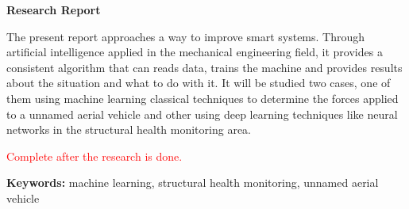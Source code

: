 \begin{center}
	\vspace{100pt}
	{\Large\bfseries Research Report}
\end{center}
\noindent
The present report approaches a way to improve smart systems. Through artificial intelligence applied in the mechanical engineering field, it provides a consistent algorithm that can reads data, trains the machine and provides results about the situation and what to do with it. It will be studied two cases, one of them using machine learning classical techniques to determine the forces applied to a unnamed aerial vehicle and other using deep learning techniques like neural networks in the structural health monitoring area. 

\noindent
\textcolor{red}{Complete after the research is done.}

\noindent
{\sffamily\bfseries Keywords:} machine learning, structural health monitoring, unnamed aerial vehicle

\clearpage